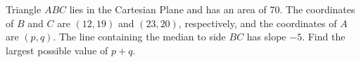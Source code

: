 Triangle $ABC$ lies in the Cartesian Plane and has an area of 70. The coordinates of $B$ and $C$ are $(12,19)$ and $(23,20)$, respectively, and the coordinates of $A$ are $(p,q)$. The line containing the median to side $BC$ has slope $-5$. Find the largest possible value of $p+q$.